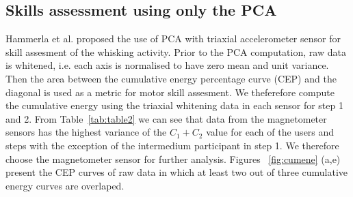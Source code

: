 \documentclass{sigchi}
\begin{document}
\subsection{Skills assessment using only the PCA}
Hammerla et al. \cite{Hammerla2011} proposed the use of PCA with triaxial accelerometer sensor for skill assesment 
of the whisking activity. Prior to the PCA computation, raw data is whitened, i.e. each axis is normalised to have zero mean and unit variance.
Then the area between the cumulative energy percentage curve (CEP) and the diagonal is used as a metric for motor skill assesment.
We theferefore compute the cumulative energy using the triaxial whitening data in each sensor for step 1 and 2.
From Table~\ref{tab:table2} we can see that data from the magnetometer sensors has the highest variance 
of the $C_1 + C_2$ value for each of the users and steps with the exception of the intermedium participant in step 1. 
We therefore choose the magnetometer sensor for further analysis.
Figures ~\ref{fig:cumene} (a,e) present the CEP curves of raw data in which at least two out of three cumulative energy curves are overlaped. 
\end{document}

